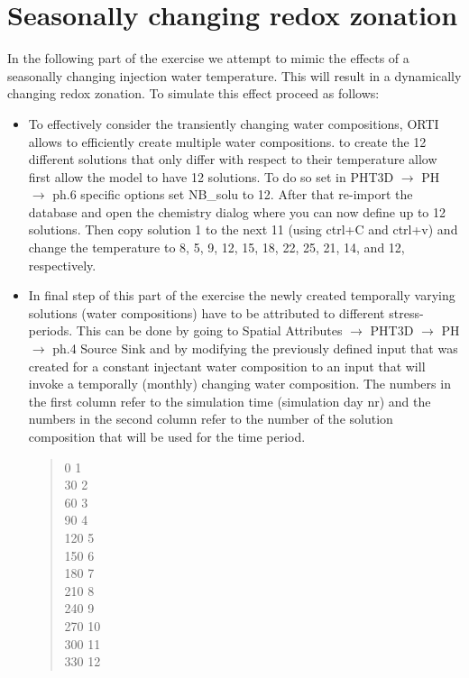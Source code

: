 \section[Seasonally changing redox zonation]{Seasonally changing redox zonation}

In the following part of the exercise we attempt to mimic the effects of a 
seasonally changing injection water temperature. 
This will result in a dynamically changing redox zonation.
To simulate this effect proceed as follows:

\begin{itemize}

\item To effectively consider the transiently changing water compositions, 
ORTI allows to efficiently create multiple water compositions.
to create the 12 different solutions that only differ with respect 
to their temperature allow first allow the model to have 12 solutions. 
To do so set in {\color{blue}PHT3D} $\rightarrow$ {\color{blue}PH} 
$\rightarrow$ {\color{blue}ph.6 specific options}
set {\color{red}NB\_solu} to 12. After that re-import the database and open the 
chemistry dialog where you can now define up to 12 solutions. 
Then copy solution 1 to the next 11 (using ctrl+C and ctrl+v) and change the 
temperature to 8, 5, 9, 12, 15, 18, 22, 25, 21, 14, and 12, respectively. 

\item In final step of this part of the exercise the newly created temporally varying 
solutions (water compositions) have to be attributed to different stress-periods.
This can be done by going to {\color{blue}Spatial Attributes} 
$\rightarrow$ {\color{blue}PHT3D} $\rightarrow$ {\color{blue}PH} 
$\rightarrow$ {\color{blue}ph.4 Source \/ Sink} and 
by modifying the previously defined 
input that was created for a constant injectant water composition to an 
input that will invoke a temporally (monthly) changing water composition.
The numbers in the first column refer to the simulation time (simulation day nr) 
and the numbers in the second column refer to the number of the 
solution composition that will be used for the time period. 

{\color{red}
\begin{quote}
0	1 \\
30	2 \\
60	3 \\
90	4 \\
120	5 \\
150	6 \\
180	7 \\
210	8 \\
240	9 \\
270	10 \\
300	11 \\
330	12 \\
\end{quote}}


\end{itemize}
